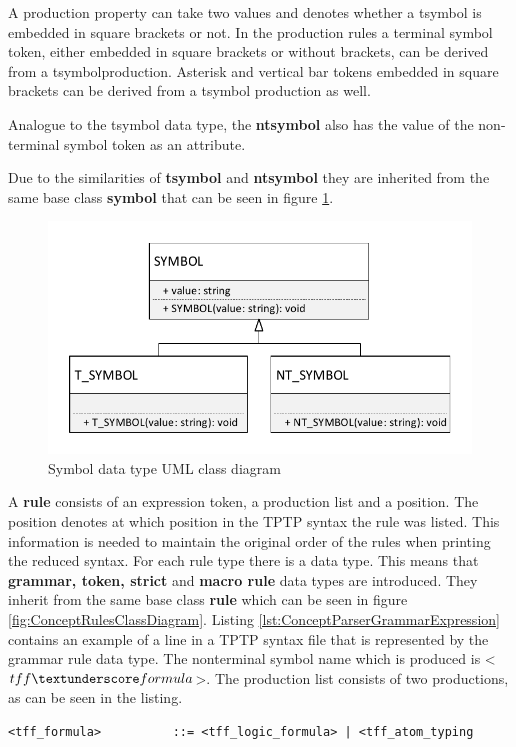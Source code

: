 A production property can take two values and denotes whether a t\textunderscore  symbol is embedded in square brackets or not. In the production rules a terminal symbol token, either embedded in square brackets or without brackets, can be derived from a t\textunderscore  symbol\textunderscore  production. Asterisk and vertical bar tokens embedded in square brackets can be derived from a t\textunderscore  symbol production as well. 

Analogue to the t\textunderscore symbol data type, the \textbf{nt\textunderscore  symbol} also has the value of the non-terminal symbol token as an attribute. 

Due to the similarities of \textbf{t\textunderscore symbol} and \textbf{nt\textunderscore  symbol} they are inherited from the same base class \textbf{symbol} that can be seen in figure \ref{fig:ConceptSymbolsClassDiagram}.

\begin{figure}[H]
\centering
\includegraphics[width=.8\textwidth]{images/Concept_uml_data_types_symbols.pdf}
\caption{Symbol data type UML class diagram}
\label{fig:ConceptSymbolsClassDiagram}
\end{figure}

A \textbf{rule} consists of an expression token, a production list and a position.
The position denotes at which position in the TPTP syntax the rule was listed.
This information is needed to maintain the original order of the rules when printing the reduced syntax.
For each rule type there is a data type.
This means that \textbf{grammar, token, strict} and \textbf{macro rule} data types are introduced. They inherit from the same base class \textbf{rule} which can be seen in figure \ref{fig:ConceptRulesClassDiagram}.
Listing \ref{lst:ConceptParserGrammarExpression} contains an example of a line in a \ac{TPTP} syntax file that is represented by the grammar rule data type.
The nonterminal symbol name which is produced is <$tff \textunderscore formula$>.  The production list consists of two productions, as can be seen in the listing.
\begin{lstlisting}[basicstyle=\scriptsize	,caption= Grammar expression,label= lst:ConceptParserGrammarExpression]
<tff_formula>          ::= <tff_logic_formula> | <tff_atom_typing
\end{lstlisting}

